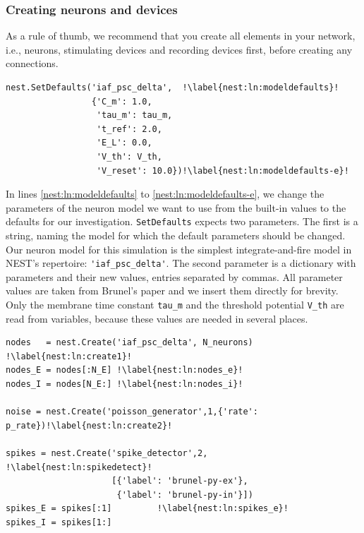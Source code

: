 \documentclass{article}
\begin{document}
\subsubsection{Creating neurons and devices}

As a rule of thumb, we recommend that you create all elements in your
network, i.e., neurons, stimulating devices and recording devices
first, before creating any connections. 

\begin{lstlisting}[name=Brunel_interactive]
nest.SetDefaults('iaf_psc_delta',  !\label{nest:ln:modeldefaults}!
                 {'C_m': 1.0,
                  'tau_m': tau_m,
                  't_ref': 2.0,
                  'E_L': 0.0,
                  'V_th': V_th,
                  'V_reset': 10.0})!\label{nest:ln:modeldefaults-e}!
\end{lstlisting}

In lines \ref{nest:ln:modeldefaults} to \ref{nest:ln:modeldefaults-e},
we change the parameters of the neuron model we want to use from the
built-in values to the defaults for our investigation.
\lstinline!SetDefaults! expects two parameters. The first is a string,
naming the model for which the default parameters should be
changed. Our neuron model for this simulation is the simplest
integrate-and-fire model in NEST's repertoire:
\lstinline!'iaf_psc_delta'!. The second parameter is a dictionary with
parameters and their new values, entries separated by commas. All
parameter values are taken from Brunel's paper \citep{Brunel00} and we
insert them directly for brevity. Only the membrane time constant
\lstinline!tau_m! and the threshold potential \lstinline!V_th! are
read from variables, because these values are needed in several places.

\begin{lstlisting}[name=Brunel_interactive]
nodes   = nest.Create('iaf_psc_delta', N_neurons) !\label{nest:ln:create1}!
nodes_E = nodes[:N_E] !\label{nest:ln:nodes_e}!
nodes_I = nodes[N_E:] !\label{nest:ln:nodes_i}!

noise = nest.Create('poisson_generator',1,{'rate': p_rate})!\label{nest:ln:create2}!

spikes = nest.Create('spike_detector',2,    !\label{nest:ln:spikedetect}!
                     [{'label': 'brunel-py-ex'},
                      {'label': 'brunel-py-in'}])
spikes_E = spikes[:1]         !\label{nest:ln:spikes_e}!             
spikes_I = spikes[1:]
\end{lstlisting} 
\end{document}
